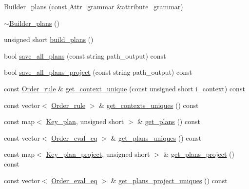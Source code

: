 \begin{CompactItemize}
\item 
\hyperlink{classgenevalmag_1_1Builder__plans_bd168919b4dfc51ed9c400f5afac0043}{Builder\_\-plans} (const \hyperlink{classgenevalmag_1_1Attr__grammar}{Attr\_\-grammar} \&attribute\_\-grammar)
\item 
\hyperlink{classgenevalmag_1_1Builder__plans_f19ca3bf57580ee40b317e119cacdc66}{$\sim$Builder\_\-plans} ()
\item 
unsigned short \hyperlink{classgenevalmag_1_1Builder__plans_3337ccac1c358d9b0a1de456ff74b0cb}{build\_\-plans} ()
\item 
bool \hyperlink{classgenevalmag_1_1Builder__plans_a15ea4156613c75cfca5ecc0bd6a5193}{save\_\-all\_\-plans} (const string path\_\-output) const 
\item 
bool \hyperlink{classgenevalmag_1_1Builder__plans_7017816e03c141df9dbdb55f3f8f896c}{save\_\-all\_\-plans\_\-project} (const string path\_\-output) const 
\item 
const \hyperlink{namespacegenevalmag_ed20da32fb9692645ae53d911d274fd5}{Order\_\-rule} \& \hyperlink{classgenevalmag_1_1Builder__plans_72ef4716a24888c994c1b0a5c70b88a8}{get\_\-context\_\-unique} (const unsigned short i\_\-context) const 
\item 
const vector$<$ \hyperlink{namespacegenevalmag_ed20da32fb9692645ae53d911d274fd5}{Order\_\-rule} $>$ \& \hyperlink{classgenevalmag_1_1Builder__plans_72a79884798342895b1b0779a1938031}{get\_\-contexts\_\-uniques} () const 
\item 
const map$<$ \hyperlink{structgenevalmag_1_1k__plan}{Key\_\-plan}, unsigned short $>$ \& \hyperlink{classgenevalmag_1_1Builder__plans_75890521873bd1f8bee15799d820d755}{get\_\-plans} () const 
\item 
const vector$<$ \hyperlink{namespacegenevalmag_0bb2e8b0fa1b07b873f0363719de7b64}{Order\_\-eval\_\-eq} $>$ \& \hyperlink{classgenevalmag_1_1Builder__plans_d5d96d5e07170749447ff69b3282cd3d}{get\_\-plans\_\-uniques} () const 
\item 
const map$<$ \hyperlink{structgenevalmag_1_1k__p__project}{Key\_\-plan\_\-project}, unsigned short $>$ \& \hyperlink{classgenevalmag_1_1Builder__plans_011e4668e269c69022cae075075a0087}{get\_\-plans\_\-project} () const 
\item 
const vector$<$ \hyperlink{namespacegenevalmag_0bb2e8b0fa1b07b873f0363719de7b64}{Order\_\-eval\_\-eq} $>$ \& \hyperlink{classgenevalmag_1_1Builder__plans_a4f340be44a4b2592c8f5aaabf88305e}{get\_\-plans\_\-project\_\-uniques} () const 

\end{CompactItemize}
